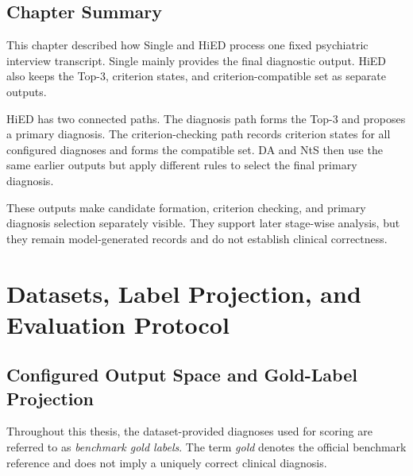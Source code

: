 \documentclass[12pt,a4paper,oneside]{report}
\begin{document}
\section{Chapter Summary}

This chapter described how Single and HiED process one fixed psychiatric
interview transcript. Single mainly provides the final diagnostic
output. HiED also keeps the Top-3, criterion states, and
criterion-compatible set as separate outputs.

HiED has two connected paths. The diagnosis path forms the Top-3 and
proposes a primary diagnosis. The criterion-checking path records
criterion states for all configured diagnoses and forms the compatible
set. DA and NtS then use the same earlier outputs but apply different
rules to select the final primary diagnosis.

These outputs make candidate formation, criterion checking, and primary
diagnosis selection separately visible. They support later stage-wise
analysis, but they remain model-generated records and do not establish
clinical correctness.

\chapter{Datasets, Label Projection, and Evaluation Protocol}
\label{ch:data}

\section{Configured Output Space and Gold-Label Projection}
\label{sec:gold-label-conventions}

Throughout this thesis, the dataset-provided diagnoses used for scoring are referred to as \emph{benchmark gold labels}. The term \emph{gold} denotes the official benchmark reference and does not imply a uniquely correct clinical diagnosis.
\end{document}
